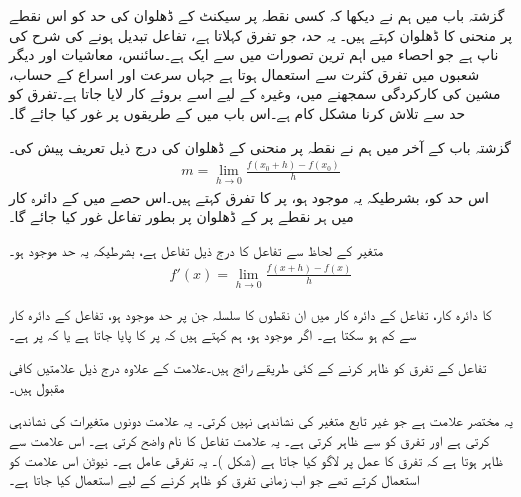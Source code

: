 
گزشتہ باب میں ہم نے دیکھا کہ کسی نقطہ پر سیکنٹ کے ڈھلوان کی حد کو اس نقطے پر منحنی کا ڈھلوان کہتے ہیں۔ یہ حد، جو تفرق کہلاتا ہے، تفاعل تبدیل ہونے کی شرح کی ناپ ہے جو احصاء میں اہم ترین تصورات میں سے ایک ہے۔سائنس، معاشیات اور دیگر شعبوں میں   تفرق کثرت سے  استعمال ہوتا ہے  جہاں سرعت اور اسراع کے حساب، مشین کی کارکردگی سمجھنے میں، وغیرہ کے لیے اسے بروئے کار  لایا جاتا ہے۔تفرق کو حد سے تلاش کرنا مشکل کام ہے۔اس باب میں  کے طریقوں پر غور کیا جائے گا۔ 

گزشتہ باب کے آخر میں ہم نے نقطہ  پر منحنی  کے   ڈھلوان  کی درج ذیل تعریف پیش کی۔
\begin{align*}
m=\lim_{h\to 0}\frac{f(x_0+h)-f(x_0)}{h}
\end{align*} 
اس حد کو، بشرطیکہ یہ موجود ہو،  پر  کا تفرق کہتے ہیں۔اس حصے میں  کے  دائرہ کار میں ہر نقطے پر  کے  ڈھلوان پر  بطور تفاعل غور کیا جائے گا۔

متغیر  کے لحاظ سے تفاعل  کا  درج ذیل  تفاعل  ہے، بشرطیکہ یہ حد موجود ہو۔
\begin{align*}
f'(x)=\lim_{h\to 0}\frac{f(x+h)-f(x)}{h}
\end{align*}

 کا دائرہ کار، تفاعل  کے  دائرہ کار میں ان نقطوں کا سلسلہ جن پر حد موجود ہو، تفاعل  کے دائرہ کار سے کم ہو سکتا ہے۔ اگر  موجود ہو،  ہم کہتے ہیں کہ   پر  کا  پایا جاتا ہے یا  کہ  پر   ہے۔

تفاعل  کے تفرق کو ظاہر کرنے کے کئی طریقے رائج ہیں۔علامت  کے علاوہ درج ذیل علامتیں کافی مقبول ہیں۔
\begin{description}
 \setlength{\labelsep}{4em}

یہ مختصر علامت ہے جو غیر تابع متغیر کی نشاندہی نہیں کرتی۔
یہ علامت دونوں متغیرات کی نشاندہی کرتی ہے اور تفرق کو  سے ظاہر کرتی ہے۔  
یہ علامت تفاعل کا نام واضح کرتی ہے۔
اس علامت سے ظاہر ہوتا ہے کہ تفرق کا عمل  پر لاگو کیا جاتا ہے (شکل )۔
یہ تفرقی عامل ہے۔
نیوٹن اس علامت کو استعمال کرتے تھے جو اب زمانی  تفرق کو ظاہر کرنے کے لیے استعمال کیا جاتا ہے۔
\end{description} 


